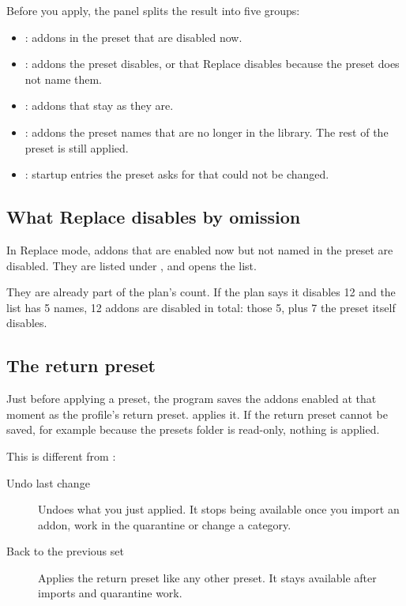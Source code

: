 \documentclass[11pt,a4paper]{article}
\begin{document}
Before you apply, the  panel splits the result into five groups:

\begin{itemize}
  \item {}: addons in the preset that are disabled now.
  \item {}: addons the preset disables, or that Replace disables
    because the preset does not name them.
  \item {}: addons that stay as they are.
  \item {}: addons the preset names that are no
    longer in the library. The rest of the preset is still applied.
  \item {}: startup entries the preset asks for
    that could not be changed.
\end{itemize}


\subsection{What Replace disables by omission}

In Replace mode, addons that are enabled now but not named in the preset are
disabled. They are listed under , and 
opens the list.

They are already part of the plan's count. If the plan says it disables 12 and
the list has 5 names, 12 addons are disabled in total: those 5, plus 7 the
preset itself disables.

\subsection{The return preset}

Just before applying a preset, the program saves the addons enabled at that
moment as the profile's return preset.  applies it.
If the return preset cannot be saved, for example because the presets folder is
read-only, nothing is applied.

This is different from :

\begin{description}
  \item[Undo last change] Undoes what you just applied. It stops being
    available once you import an addon, work in the quarantine or change a
    category.
  \item[Back to the previous set] Applies the return preset like any other
    preset. It stays available after imports and quarantine work.
\end{description}
\end{document}
